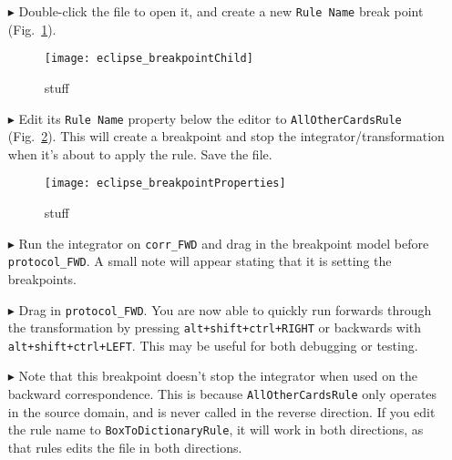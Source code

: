 \begin{itemize}

\item[$\blacktriangleright$] Double-click the file to open it, and create a new \texttt{Rule Name} break point (Fig.~\ref{eclipse:breakpointChild}).

\begin{figure}[htbp]
\begin{center}
  \texttt{[image: eclipse\_breakpointChild]}
  \caption{stuff}
  \label{eclipse:breakpointChild}
\end{center}
\end{figure}

\item[$\blacktriangleright$] Edit its \texttt{Rule Name} property below the editor to \texttt{AllOtherCardsRule} (Fig.~\ref{eclipse:bpProps}). This will create
a breakpoint and stop the integrator/transformation when it's about to apply the rule. Save the file.

\begin{figure}[htbp]
\begin{center}
  \texttt{[image: eclipse\_breakpointProperties]}
  \caption{stuff}
  \label{eclipse:bpProps}
\end{center}
\end{figure}

\item[$\blacktriangleright$] Run the integrator on \texttt{corr\_FWD} and drag in the breakpoint model before \texttt{protocol\_FWD}. A small note will appear
stating that it is setting the breakpoints.

\item[$\blacktriangleright$] Drag in \texttt{protocol\_FWD}. You are now able to quickly run forwards through the transformation by pressing
\texttt{alt+shift+ctrl+RIGHT} or backwards with \texttt{alt+shift+ctrl+LEFT}. This may be useful for both debugging or testing. 

\item[$\blacktriangleright$] Note that this breakpoint doesn't stop the integrator when used on the backward correspondence. This is because
\texttt{AllOtherCardsRule} only operates in the source domain, and is never called in the reverse direction. If you edit the rule name to
\texttt{BoxToDictionaryRule}, it will work in both directions, as that rules edits the file in both directions.

\end{itemize}
